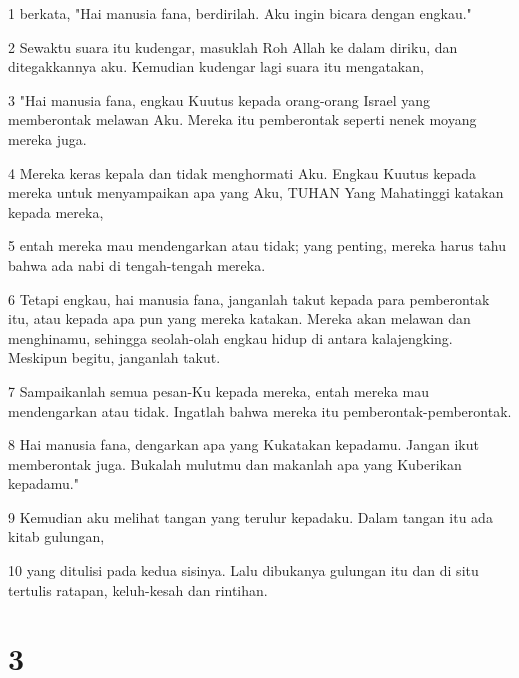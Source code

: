 \par 1 berkata, "Hai manusia fana, berdirilah. Aku ingin bicara dengan engkau."
\par 2 Sewaktu suara itu kudengar, masuklah Roh Allah ke dalam diriku, dan ditegakkannya aku. Kemudian kudengar lagi suara itu mengatakan,
\par 3 "Hai manusia fana, engkau Kuutus kepada orang-orang Israel yang memberontak melawan Aku. Mereka itu pemberontak seperti nenek moyang mereka juga.
\par 4 Mereka keras kepala dan tidak menghormati Aku. Engkau Kuutus kepada mereka untuk menyampaikan apa yang Aku, TUHAN Yang Mahatinggi katakan kepada mereka,
\par 5 entah mereka mau mendengarkan atau tidak; yang penting, mereka harus tahu bahwa ada nabi di tengah-tengah mereka.
\par 6 Tetapi engkau, hai manusia fana, janganlah takut kepada para pemberontak itu, atau kepada apa pun yang mereka katakan. Mereka akan melawan dan menghinamu, sehingga seolah-olah engkau hidup di antara kalajengking. Meskipun begitu, janganlah takut.
\par 7 Sampaikanlah semua pesan-Ku kepada mereka, entah mereka mau mendengarkan atau tidak. Ingatlah bahwa mereka itu pemberontak-pemberontak.
\par 8 Hai manusia fana, dengarkan apa yang Kukatakan kepadamu. Jangan ikut memberontak juga. Bukalah mulutmu dan makanlah apa yang Kuberikan kepadamu."
\par 9 Kemudian aku melihat tangan yang terulur kepadaku. Dalam tangan itu ada kitab gulungan,
\par 10 yang ditulisi pada kedua sisinya. Lalu dibukanya gulungan itu dan di situ tertulis ratapan, keluh-kesah dan rintihan.

\chapter{3}

